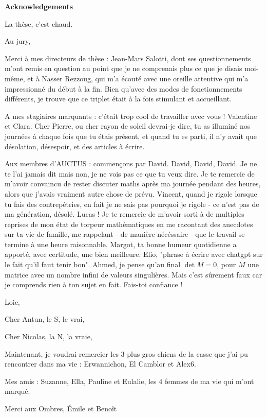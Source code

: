 \begin{center}
    \textbf{Acknowledgements}
\end{center}
La thèse, c'est chaud.

Au jury,

Merci à mes directeurs de thèse : Jean-Mars Salotti, dont ses questionnements m'ont remis en question au point que je ne comprenais plus ce que je disais moi-même, et à Nasser Rezzoug, qui m'a écouté avec une oreille attentive qui m'a impressionné du début à la fin. Bien qu'avec des modes de fonctionnements différents, je trouve que ce triplet était à la fois stimulant et accueillant.

A mes stagiaires marquants : c'était trop cool de travailler avec vous ! Valentine et Clara.
Cher Pierre, ou cher rayon de soleil devrai-je dire, tu as illuminé nos journées à chaque fois que tu étais présent, et quand tu es parti, il n'y avait que désolation, désespoir, et des articles à écrire.

Aux membres d'AUCTUS : commençons par David. David, David, David. Je ne te l'ai jamais dit mais non, je ne vois pas ce que tu veux dire. Je te remercie de m'avoir convaincu de rester discuter maths après ma journée pendant des heures, alors que j'avais vraiment autre chose de prévu. Vincent, quand je rigole lorsque tu fais des contrepétries, en fait je ne sais pas pourquoi je rigole - ce n'est pas de ma génération, désolé. Lucas ! Je te remercie de m'avoir sorti à de multiples reprises de mon état de torpeur mathématiques en me racontant des anecdotes sur ta vie de famille, me rappelant - de manière nécéssaire - que le travail se termine à une heure raisonnable. Margot, ta bonne humeur quotidienne a apporté, avec certitude, une bien meilleure. Elio, "phrase à écrire avec chatgpt sur le fait qu'il faut tenir bon". Ahmed, je pense qu'au final $\det{M} = 0$, pour $M$ une matrice avec un nombre infini de valeurs singulières. Mais c'est sûrement faux car je comprends rien à ton sujet en fait. Fais-toi confiance ! 

Loic,

Cher Antun, le S, le vrai, 

Cher Nicolas, la N, la vraie, 


Maintenant, je voudrai remercier les 3 plus gros chiens de la casse que j'ai pu rencontrer dans ma vie : Erwannichon, El Camblor et Alex6.


Mes amis : Suzanne, Ella, Pauline et Eulalie, les 4 femmes de ma vie qui m'ont marqué.

Merci aux Ombres, Émile et Benoît

